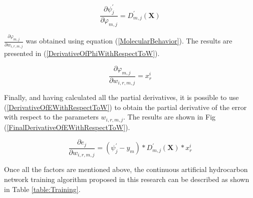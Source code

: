 \documentclass{ieeeaccess}
\begin{document}
\begin{equation}\label{DerivativeOfPsiWithRespectToPhi}
\frac{\partial\psi_j^\prime}{\partial\varphi_{m,j}}=D_{m,j}^\prime\left(\mathbf{X}\right)
\end{equation}

\(\frac{\partial\varphi_{m,j}}{\partial w_{i,r,m,j}}\) was obtained using equation (\ref{MolecularBehavior}). The results are presented in (\ref{DerivativeOfPhiWithRespectToW}).

\begin{equation}\label{DerivativeOfPhiWithRespectToW}
\frac{\partial\varphi_{m,j}}{\partial w_{i,r,m,j}}=x_r^i
\end{equation}

Finally, and having calculated all the partial derivatives, it is possible to use (\ref{DerivativeOfEWithRespectToW}) to obtain the partial derivative of the error with respect to the parameters \(w_{i,r,m,j}\). The results are shown in Fig (\ref{FinalDerivativeOfEWithRespectToW}).

\begin{equation}\label{FinalDerivativeOfEWithRespectToW}
\frac{\partial e_j}{\partial w_{i,r,m,j}}=(\psi_j^\prime - y_m)\ast D_{m,j}^\prime\left(\mathbf{X}\right)\ast x_r^i
\end{equation}

Once all the factors are mentioned above, the continuous artificial hydrocarbon network training algorithm proposed in this research can be described as shown in Table \ref{table:Training}.
\end{document}
